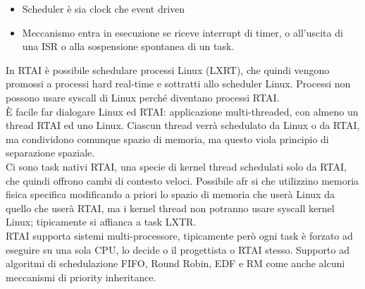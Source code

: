 \documentclass{article}
\begin{document}
\begin{itemize}
\item Scheduler è sia clock che event driven
\item Meccanismo entra in esecuzione se riceve interrupt di timer, o all'uscita di una ISR o alla sospensione spontanea di un task.
\end{itemize}
In RTAI è possibile schedulare processi Linux (LXRT), che quindi vengono promossi a processi hard real-time e sottratti allo scheduler Linux. Processi non possono usare syscall di Linux perché diventano processi RTAI.\\ È facile far dialogare Linux ed RTAI: applicazione multi-threaded, con almeno un thread RTAI ed uno Linux. Ciascun thread verrà schedulato da Linux o da RTAI, ma condividono comunque spazio di memoria, ma questo viola principio di separazione spaziale.\\ Ci sono task nativi RTAI, una specie di kernel thread schedulati solo da RTAI, che quindi offrono cambi di contesto veloci. Possibile afr si che utilizzino memoria fisica specifica modificando a priori lo spazio di memoria che userà Linux da quello che userà RTAI, ma i kernel thread non potranno usare syscall kernel Linux; tipicamente si affianca a task LXTR.\\ RTAI supporta sistemi multi-processore, tipicamente però ogni task è forzato ad eseguire su una sola CPU, lo decide o il progettista o RTAI stesso. Supporto ad algoritmi di schedulazione FIFO, Round Robin, EDF e RM come anche alcuni meccanismi di priority inheritance.
\end{document}
